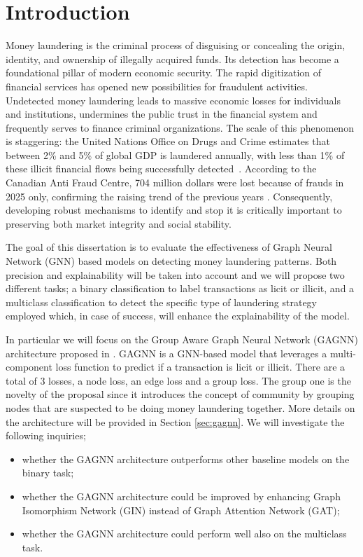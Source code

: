 \chapter{Introduction}\label{intro}
Money laundering is the criminal process of disguising or concealing the origin, identity, and ownership of illegally acquired funds.
Its detection has become a foundational pillar of modern economic security.
The rapid digitization of financial services has opened new possibilities for fraudulent activities.
Undetected money laundering leads to massive economic losses for individuals and institutions, undermines the public trust in the financial system and frequently serves to finance criminal organizations.
The scale of this phenomenon is staggering: the United Nations Office on Drugs and Crime estimates that between 2\% and 5\% of global GDP is laundered annually, with less than 1\% of these illicit financial flows being successfully detected~\cite{unodc2011estimating,europol2016does}.
According to the Canadian Anti Fraud Centre, 704 million dollars were lost because of frauds in 2025 only, confirming the raising trend of the previous years \cite{cafc_home}. 
Consequently, developing robust mechanisms to identify and stop it is critically important to preserving both market integrity and social stability.

The goal of this dissertation is to evaluate the effectiveness of Graph Neural Network (GNN) based models on detecting money laundering patterns. Both precision and explainability will be taken into account and we will propose two different tasks; a binary classification to label transactions as licit or illicit, and a multiclass classification to detect the specific type of laundering strategy employed which, in case of success, will enhance the explainability of the model. 

In particular we will focus on the Group Aware Graph Neural Network (GAGNN) architecture proposed in \cite{mainpaper}. GAGNN is a GNN-based model that leverages a multi-component loss function to predict if a transaction is licit or illicit. There are a total of 3 losses, a node loss, an edge loss and a group loss. The group one is the novelty of the proposal since it introduces the concept of community by grouping nodes that are suspected to be doing money laundering together. More details on the architecture will be provided in Section \ref{sec:gagnn}. 
We will investigate the following inquiries;
\begin{itemize}
    \item whether the GAGNN architecture outperforms other baseline models on the binary task;
    \item whether the GAGNN architecture could be improved by enhancing Graph Isomorphism Network (GIN) instead of Graph Attention Network (GAT);
    \item whether the GAGNN architecture could perform well also on the multiclass task.
\end{itemize}

